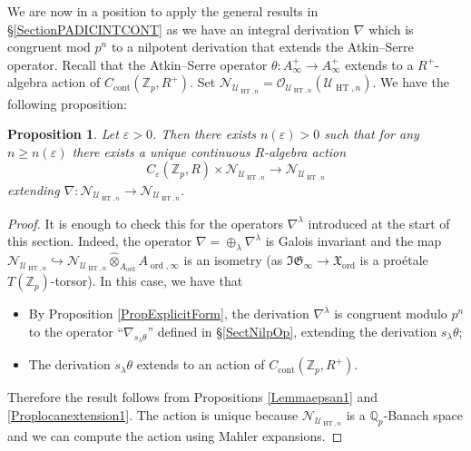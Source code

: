 \documentclass[10pt, oneside]{amsart}
\numberwithin{equation}{subsection}
\newtheorem{proposition}[equation]{Proposition}
\theoremstyle{definition}
\theoremstyle{remark}
\newcommand{\mbb}[1]{\mathbb{#1}}
\newcommand{\hatot}{\hat{\otimes}}
\newcommand{\opn}[1]{\operatorname{#1}}
\def\epsilon{\varepsilon}
\begin{document}
We are now in a position to apply the general results in \S \ref{SectionPADICINTCONT} as we have an integral derivation $\nabla$ which is congruent mod $p^n$ to a nilpotent derivation that extends the Atkin--Serre operator. Recall that the Atkin--Serre operator $\theta \colon A^+_{\infty} \to A^+_{\infty}$ extends to a $R^+$-algebra action of $C_{\opn{cont}}(\mbb{Z}_p, R^+)$. Set $\mathscr{N}_{\mathcal{U}_{\opn{HT}, n}} = \mathcal{O}_{\mathcal{U}_{\opn{HT}, n}}(\mathcal{U}_{\opn{HT}, n})$. We have the following proposition:

\begin{proposition} \label{GMinterpolationOverOrdProp}
    Let $\epsilon > 0$. Then there exists $n(\epsilon) > 0$ such that for any $n \geq n(\epsilon)$ there exists a unique continuous $R$-algebra action
    \[
    C_{\varepsilon}(\mbb{Z}_p, R) \times \mathscr{N}_{\mathcal{U}_{\opn{HT}, n}} \to \mathscr{N}_{\mathcal{U}_{\opn{HT}, n}}
    \]
    extending $\nabla \colon \mathscr{N}_{\mathcal{U}_{\opn{HT}, n}} \to \mathscr{N}_{\mathcal{U}_{\opn{HT}, n}}$.
\end{proposition}
\begin{proof}
    It is enough to check this for the operators $\nabla^{\lambda}$ introduced at the start of this section. Indeed, the operator $\nabla = \oplus_{\lambda} \nabla^{\lambda}$ is Galois invariant and the map $\mathscr{N}_{\mathcal{U}_{\opn{HT}, n}} \hookrightarrow \mathscr{N}_{\mathcal{U}_{\opn{HT}, n}} \hatot_{A_{\opn{ord}}} A_{\opn{ord}, \infty}$ is an isometry (as $\mathfrak{IG}_{\infty} \to \mathfrak{X}_{\opn{ord}}$ is a pro\'{e}tale $T(\mbb{Z}_p)$-torsor). In this case, we have that
    \begin{itemize}
        \item By Proposition \ref{PropExplicitForm}, the derivation $\nabla^{\lambda}$ is congruent modulo $p^n$ to the operator ``$\nabla_{s_{\lambda} \theta}$'' defined in \S \ref{SectNilpOp}, extending the derivation $s_{\lambda} \theta$;
        
        \item The derivation $s_{\lambda}\theta$ extends to an action of $C_{\opn{cont}}(\mbb{Z}_p, R^+)$.
    \end{itemize}
    Therefore the result follows from Propositions \ref{Lemmaepsan1} and \ref{Proplocanextension1}. The action is unique because $\mathscr{N}_{\mathcal{U}_{\opn{HT}, n}}$ is a $\mbb{Q}_p$-Banach space and we can compute the action using Mahler expansions. 
\end{proof}
\end{document}
